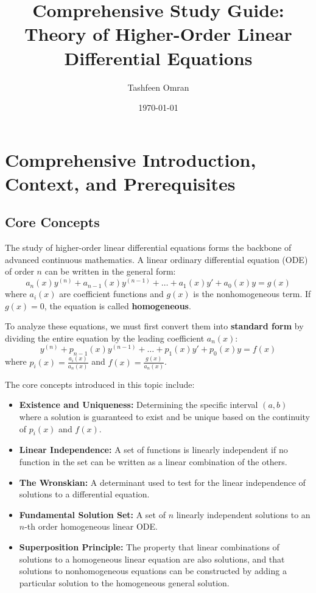 \documentclass[11pt, a4paper]{article}
\theoremstyle{definition}
\theoremstyle{remark}
\begin{document}
\title{Comprehensive Study Guide: Theory of Higher-Order Linear Differential Equations}
\author{Tashfeen Omran}
\date{\today}
\maketitle

\tableofcontents
\newpage

\section{Comprehensive Introduction, Context, and Prerequisites}

\subsection{Core Concepts}
The study of higher-order linear differential equations forms the backbone of advanced continuous mathematics. A linear ordinary differential equation (ODE) of order $n$ can be written in the general form:
\[ a_n(x)y^{(n)} + a_{n-1}(x)y^{(n-1)} + \dots + a_1(x)y' + a_0(x)y = g(x) \]
where $a_i(x)$ are coefficient functions and $g(x)$ is the nonhomogeneous term. If $g(x) = 0$, the equation is called \textbf{homogeneous}. 

To analyze these equations, we must first convert them into \textbf{standard form} by dividing the entire equation by the leading coefficient $a_n(x)$:
\[ y^{(n)} + p_{n-1}(x)y^{(n-1)} + \dots + p_1(x)y' + p_0(x)y = f(x) \]
where $p_i(x) = \frac{a_i(x)}{a_n(x)}$ and $f(x) = \frac{g(x)}{a_n(x)}$. 

The core concepts introduced in this topic include:
\begin{itemize}
    \item \textbf{Existence and Uniqueness:} Determining the specific interval $(a, b)$ where a solution is guaranteed to exist and be unique based on the continuity of $p_i(x)$ and $f(x)$.
    \item \textbf{Linear Independence:} A set of functions is linearly independent if no function in the set can be written as a linear combination of the others.
    \item \textbf{The Wronskian:} A determinant used to test for the linear independence of solutions to a differential equation.
    \item \textbf{Fundamental Solution Set:} A set of $n$ linearly independent solutions to an $n$-th order homogeneous linear ODE.
    \item \textbf{Superposition Principle:} The property that linear combinations of solutions to a homogeneous linear equation are also solutions, and that solutions to nonhomogeneous equations can be constructed by adding a particular solution to the homogeneous general solution.
\end{itemize}
\end{document}
